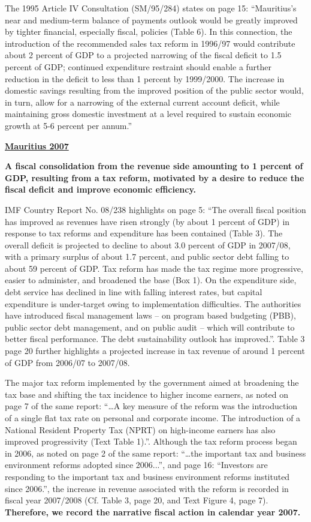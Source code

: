 The 1995 Article IV Consultation (SM/95/284) states on page 15: “Mauritius’s near and medium-term balance of payments outlook would be greatly improved by tighter financial, especially fiscal, policies (Table 6). In this connection, the introduction of the recommended sales tax reform in 1996/97 would contribute about 2 percent of GDP to a projected narrowing of the fiscal deficit to 1.5 percent of GDP; continued expenditure restraint should enable a further reduction in the deficit to less than 1 percent by 1999/2000. The increase in domestic savings resulting from the improved position of the public sector would, in turn, allow for a narrowing of the external current account deficit, while maintaining gross domestic investment at a level required to sustain economic growth at 5-6 percent per annum.”

\textbf{\underline{Mauritius 2007}}

\textbf{A fiscal consolidation from the revenue side amounting to 1 percent of GDP, resulting from a tax reform, motivated by a desire to reduce the fiscal deficit and improve economic efficiency.}

IMF Country Report No. 08/238 highlights on page 5: “The overall fiscal position has improved as revenues have risen strongly (by about 1 percent of GDP) in response to tax reforms and expenditure has been contained (Table 3). The overall deficit is projected to decline to about 3.0 percent of GDP in 2007/08, with a primary surplus of about 1.7 percent, and public sector debt falling to about 59 percent of GDP. Tax reform has made the tax regime more progressive, easier to administer, and broadened the base (Box 1). On the expenditure side, debt service has declined in line with falling interest rates, but capital expenditure is under-target owing to implementation difficulties. The authorities have introduced fiscal management laws – on program based budgeting (PBB), public sector debt management, and on public audit – which will contribute to better fiscal performance. The debt sustainability outlook has improved.”. Table 3 page 20 further highlights a projected increase in tax revenue of around 1 percent of GDP from 2006/07 to 2007/08.

The major tax reform implemented by the government aimed at broadening the tax base and shifting the tax incidence to higher income earners, as noted on page 7 of the same report: “…A key measure of the reform was the introduction of a single flat tax rate on personal and corporate income. The introduction of a National Resident Property Tax (NPRT) on high-income earners has also improved progressivity (Text Table 1).”. Although the tax reform process began in 2006, as noted on page 2 of the same report: “…the important tax and business environment reforms adopted since 2006...”, and page 16: “Investors are responding to the important tax and business environment reforms instituted since 2006.”, the increase in revenue associated with the reform is recorded in fiscal year 2007/2008 (Cf. Table 3, page 20, and Text Figure 4, page 7). \textbf{Therefore, we record the narrative fiscal action in calendar year 2007.} 

